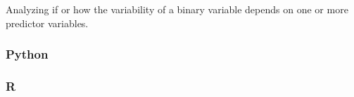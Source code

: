 \documentclass[
]{book}
\begin{document}
Analyzing if or how the variability of a binary variable depends on one or more predictor variables.

\hypertarget{python-50}{%
\subsubsection*{Python}\label{python-50}}

\hypertarget{r-50}{%
\subsubsection*{R}\label{r-50}}

  
\end{document}

